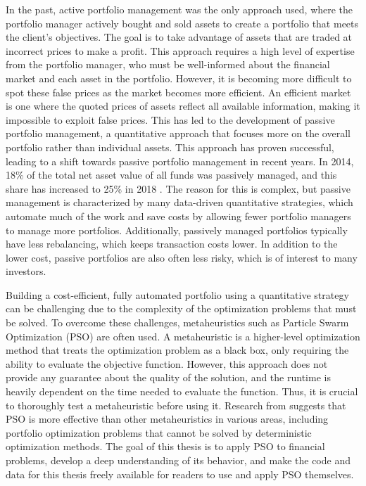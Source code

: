 \documentclass[
  oneside, a4paper, 12pt, openany]{book}
\theoremstyle{definition}
\theoremstyle{definition}
\theoremstyle{definition}
\theoremstyle{definition}
\theoremstyle{remark}
\begin{document}
In the past, active portfolio management was the only approach used, where the portfolio manager actively bought and sold assets to create a portfolio that meets the client's objectives. The goal is to take advantage of assets that are traded at incorrect prices to make a profit. This approach requires a high level of expertise from the portfolio manager, who must be well-informed about the financial market and each asset in the portfolio. However, it is becoming more difficult to spot these false prices as the market becomes more efficient. An efficient market is one where the quoted prices of assets reflect all available information, making it impossible to exploit false prices. This has led to the development of passive portfolio management, a quantitative approach that focuses more on the overall portfolio rather than individual assets. This approach has proven successful, leading to a shift towards passive portfolio management in recent years. In 2014, 18\% of the total net asset value of all funds was passively managed, and this share has increased to 25\% in 2018 \citep{TaDe2019}. The reason for this is complex, but passive management is characterized by many data-driven quantitative strategies, which automate much of the work and save costs by allowing fewer portfolio managers to manage more portfolios. Additionally, passively managed portfolios typically have less rebalancing, which keeps transaction costs lower. In addition to the lower cost, passive portfolios are also often less risky, which is of interest to many investors.

Building a cost-efficient, fully automated portfolio using a quantitative strategy can be challenging due to the complexity of the optimization problems that must be solved. To overcome these challenges, metaheuristics such as Particle Swarm Optimization (PSO) are often used. A metaheuristic is a higher-level optimization method that treats the optimization problem as a black box, only requiring the ability to evaluate the objective function. However, this approach does not provide any guarantee about the quality of the solution, and the runtime is heavily dependent on the time needed to evaluate the function. Thus, it is crucial to thoroughly test a metaheuristic before using it. Research from \citep{BuAd2021} suggests that PSO is more effective than other metaheuristics in various areas, including portfolio optimization problems that cannot be solved by deterministic optimization methods. The goal of this thesis is to apply PSO to financial problems, develop a deep understanding of its behavior, and make the code and data for this thesis freely available for readers to use and apply PSO themselves.
\end{document}

